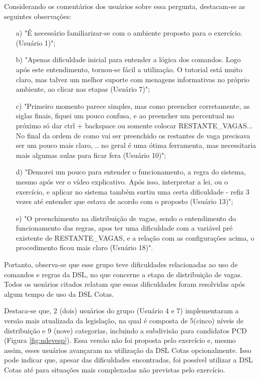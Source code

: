 Considerando os comentários dos usuários sobre essa pergunta, destacam-se as seguintes observações:

\begin{enumerate}
    \item [a)] "É necessário familiarizar-se com o ambiente proposto para o exercício.  (Usuário 1)";
    
    \item [b)] "Apenas dificuldade inicial para entender a lógica dos comandos. Logo após este entendimento, tornou-se fácil a utilização. O tutorial está muito claro, mas talvez um melhor suporte com menagens informativas no próprio ambiente, ao clicar nas etapas (Usuário 7)";
    
    \item [c)] "Primeiro momento parece simples, mas como preencher corretamente, as siglas finais, fiquei um pouco confusa, e ao preencher um percentual no próximo só dar ctrl + backspace ou somente colocar RESTANTE\_VAGAS... No final da ordem de como vai ser preenchido os restantes de vaga precisava ser um pouco mais claro, .. no geral é uma ótima ferramenta, mas necessitaria mais algumas aulas para ficar fera (Usuário 10)";
    
    \item [d)] "Demorei um pouco para entender o funcionamento, a regra do sistema, mesmo após ver o vídeo explicativo. Após isso, interpretar a lei, ou o exercício, e aplicar no sistema também surtiu uma certa dificuldade - refiz 3 vezes até entender que estava de acordo com o proposto (Usuário 13)";
    
    \item[e)] "O preenchimento na distribuição de vagas, sendo o entendimento do funcionamento das regras, apos ter uma dificuldade com a variável pré existente de RESTANTE\_VAGAS, e a relação com as configurações acima, o procedimento ficou mais claro (Usuário 18)".
\end{enumerate}

Portanto, observa-se que esse grupo teve dificuldades relacionadas ao uso de comandos e regras da DSL, no que concerne a etapa de distribuição de vagas. Todos os usuários citados relatam que essas dificuldades foram resolvidas após algum tempo de uso da DSL Cotas.

Destaca-se que, 2 (dois) usuários do grupo (Usuário 4 e 7) implementaram a versão mais atualizada da legislação, na qual é composta de 5(cinco) níveis de distribuição e 9 (nove) categorias, incluindo a subdivisão para candidatos PCD (Figura \ref{fig:ndevesp}). Essa versão não foi proposta pelo exercício e, mesmo assim, esses usuários avançaram na utilização da DSL Cotas opcionalmente. Isso pode indicar que, apesar das dificuldades encontradas, foi possível utilizar a DSL Cotas até para situações mais complexadas não previstas pelo exercício.


